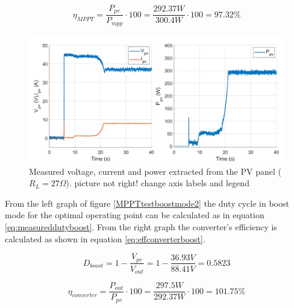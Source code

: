 \begin{equation} \label{eq:effMPPTboost}
\eta_{MPPT}= \dfrac{P_{pv}}{P_{mpp}} \cdot 100 = \dfrac{292.37W}{300.4W} \cdot 100 = 97.32\%  
\end{equation}


\begin{figure}[H]
	\begin{center}
		\includegraphics[width=1\textwidth]{../Pictures/P1/Test/Boost_mode_MPPT_Vin_Iin_Pin}
		\caption{Measured voltage, current and power extracted from the PV panel ($R_{L}=27\Omega$). picture not right! change axis labels and legend}
		\label{MPPTtestboostmode1}
	\end{center}	
\end{figure}

From the left graph of figure \ref{MPPTtestboostmode2} the duty cycle in boost mode for the optimal operating point can be calculated as in equation \ref{eq:measureddutyboost}. From the right graph the converter's efficiency is calculated as shown in equation \ref{eq:effconverterboost}.

\begin{equation} \label{eq:measureddutyboost}
D_{boost}= 1 - \dfrac{V_{pv}}{V_{out}} = 1 - \dfrac{36.93V}{88.41V} = 0.5823
\end{equation}

\begin{equation} \label{eq:effconverterboost}
\eta_{converter}= \dfrac{P_{out}}{P_{pv}} \cdot 100 = \dfrac{297.5W}{292.37W} \cdot 100 = 101.75\% 
\end{equation}

